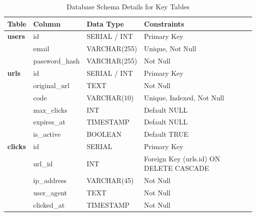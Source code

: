 \begin{table}[htbp]
    \centering
    \caption{Database Schema Details for Key Tables}
    \label{tab:database_schema}
    \begin{tabular}{llll}
        \toprule
        \textbf{Table} & \textbf{Column} & \textbf{Data Type} & \textbf{Constraints} \\
        \midrule
        \textbf{users} & id & SERIAL / INT & Primary Key \\
                       & email & VARCHAR(255) & Unique, Not Null \\
                       & password\_hash & VARCHAR(255) & Not Null \\
        \midrule
        \textbf{urls}  & id & SERIAL / INT & Primary Key \\
                       & original\_url & TEXT & Not Null \\
                       & code & VARCHAR(10) & Unique, Indexed, Not Null \\
                       & max\_clicks & INT & Default NULL \\
                       & expires\_at & TIMESTAMP & Default NULL \\
                       & is\_active & BOOLEAN & Default TRUE \\
        \midrule
        \textbf{clicks} & id & SERIAL & Primary Key \\
                       & url\_id & INT & Foreign Key (urls.id) ON DELETE CASCADE \\
                       & ip\_address & VARCHAR(45) & Not Null \\
                       & user\_agent & TEXT & Not Null \\
                       & clicked\_at & TIMESTAMP & Not Null \\
        \bottomrule
    \end{tabular}
\end{table}

